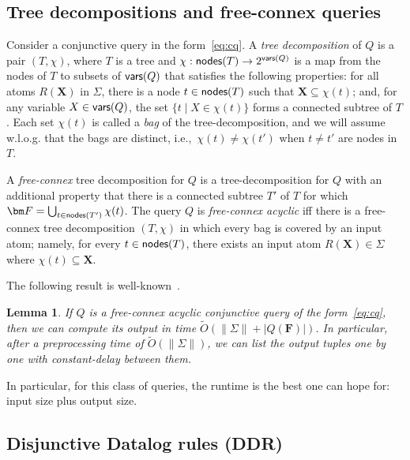 \documentclass[10pt,a4paper]{article}
\newtheorem{lemma}{Lemma}[section]
\newcommand{\norm}[1]{\|#1\|}
\newcommand{\setof}[2]{\{{#1}\mid{#2}\}}        %
\newcommand{\vars}{\text{\sf vars}}
\newcommand{\nodes}{\text{\sf nodes}}
\begin{document}
\subsection{Tree decompositions and free-connex queries}
\label{subsec:td}

Consider a conjunctive query in the form~\eqref{eq:cq}. A {\em tree decomposition} of $Q$ is
a pair $(T,\chi)$, where $T$ is a tree and $\chi: \nodes(T) \rightarrow 2^{\vars(Q)}$ is a
map from the nodes of $T$ to subsets of $\vars(Q)$ that satisfies the following properties: for all atoms $R(\bm X)$ in $\Sigma$,
there is a node $t \in \nodes(T)$ such that $\bm X \subseteq \chi(t)$; and, for any variable
$X \in \vars(Q)$, the set $\setof{t}{X \in \chi(t)}$ forms a connected subtree of $T$. Each
set $\chi(t)$ is called a {\em bag} of the tree-decomposition, and we will assume w.l.o.g.
that the bags are distinct, i.e.,~$\chi(t)\neq\chi(t')$ when $t\neq t'$ are nodes in $T$.

A {\em free-connex} tree decomposition for $Q$ is a tree-decomposition for $Q$ with an
additional property that there is a connected subtree $T'$ of $T$ for which
$\bm F = \bigcup_{t \in \nodes(T')} \chi(t)$.
The query $Q$ is {\em free-connex acyclic} iff there is a free-connex tree decomposition
$(T, \chi)$ in which every bag is covered by an input atom;
namely, for every $t \in \nodes(T)$, there exists an input atom $R(\bm X) \in \Sigma$
where $\chi(t) \subseteq \bm X$.

The following result is
well-known~\cite{DBLP:conf/vldb/Yannakakis81,DBLP:conf/csl/BaganDG07}.

\begin{lemma}
    If $Q$ is a free-connex acyclic conjunctive query of the form~\eqref{eq:cq}, then we can compute
    its output in time $\tilde O(\norm{\Sigma} + |Q(\bm F)|)$.
    In particular, after a preprocessing time of $\tilde O(\norm{\Sigma})$, we can list the output tuples one by one with constant-delay between them.
    \label{lmm:free:connex:acyclic}
\end{lemma}

In particular, for this class of queries, the runtime is the best one can hope for: input
size plus output size.

\subsection{Disjunctive Datalog rules (DDR)}
\label{subsec:disjunctive}
\end{document}
